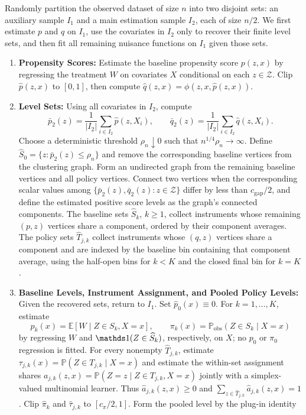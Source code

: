 Randomly partition the observed dataset of size $n$ into two disjoint sets: an auxiliary sample $I_1$ and a main estimation sample $I_2$, each of size $n/2$. We first estimate $p$ and $q$ on $I_1$, use the covariates in $I_2$ only to recover their finite level sets, and then fit all remaining nuisance functions on $I_1$ given those sets.
\begin{enumerate}
    \item \textbf{Propensity Scores:} Estimate the baseline propensity score $p(z,x)$ by regressing the treatment $W$ on covariates $X$ conditional on each $z \in \mathcal{Z}$. Clip $\hat p(z,x)$ to $[0,1]$, then compute $\hat{q}(z,x) = \phi(z, x, \hat{p}(z,x))$.
    \item \textbf{Level Sets:} Using all covariates in $I_2$, compute
    \[
        \bar p_2(z)=\frac1{|I_2|}\sum_{i\in I_2}\hat p(z,X_i),
        \qquad
        \bar q_2(z)=\frac1{|I_2|}\sum_{i\in I_2}\hat q(z,X_i).
    \]
    Choose a deterministic threshold $\rho_n\downarrow0$ such that $n^{1/4}\rho_n\to\infty$. Define $\widehat S_0=\{z:\bar p_2(z)\leqslant\rho_n\}$ and remove the corresponding baseline vertices from the clustering graph. Form an undirected graph from the remaining baseline vertices and all policy vertices. Connect two vertices when the corresponding scalar values among $\{\bar p_2(z),\bar q_2(z):z\in\mathcal Z\}$ differ by less than $c_{\mathrm{gap}}/2$, and define the estimated positive score levels as the graph's connected components. The baseline sets $\widehat S_k$, $k\geqslant1$, collect instruments whose remaining $(p,z)$ vertices share a component, ordered by their component averages. The policy sets $\widehat T_{j,k}$ collect instruments whose $(q,z)$ vertices share a component and are indexed by the baseline bin containing that component average, using the half-open bins for $k<K$ and the closed final bin for $k=K$.
    \item \textbf{Baseline Levels, Instrument Assignment, and Pooled Policy Levels:} Given the recovered sets, return to $I_1$. Set $\hat p_0(x)\equiv0$. For $k=1,\ldots,K$, estimate
    \[
        p_k(x)=\mathbb E[W\mid Z\in S_k,X=x],
        \qquad
        \pi_k(x)=\mathbb P_{\mathrm{obs}}(Z\in S_k\mid X=x)
    \]
    by regressing $W$ and $\indicator(Z\in\widehat S_k)$, respectively, on $X$; no $p_0$ or $\pi_0$ regression is fitted. For every nonempty $\widehat T_{j,k}$, estimate $\tau_{j,k}(x)=\mathbb P(Z\in T_{j,k}\mid X=x)$ and estimate the within-set assignment shares $a_{j,k}(z,x)=\mathbb P(Z=z\mid Z\in T_{j,k},X=x)$ jointly with a simplex-valued multinomial learner. Thus $\hat a_{j,k}(z,x)\geqslant0$ and $\sum_{z\in\widehat T_{j,k}}\hat a_{j,k}(z,x)=1$. Clip $\hat\pi_k$ and $\hat\tau_{j,k}$ to $[c_\pi/2,1]$. Form the pooled level by the plug-in identity

\end{enumerate}
